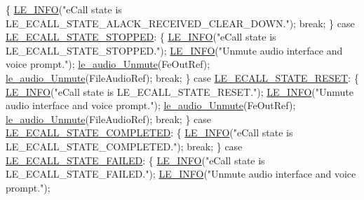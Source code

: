 \begin{DoxyCodeInclude}
{{{{{{{{        \{
            \hyperlink{le__log_8h_a23e6d206faa64f612045d688cdde5808}{LE\_INFO}(\textcolor{stringliteral}{"eCall state is LE\_ECALL\_STATE\_ALACK\_RECEIVED\_CLEAR\_DOWN."});
            \textcolor{keywordflow}{break};
        \}
        \textcolor{keywordflow}{case} \hyperlink{le__ecall__interface_8h_a233609e4724e549a1405f9177c0a07dda28740cfb795561c243501bff53343175}{LE\_ECALL\_STATE\_STOPPED}:
        \{
            \hyperlink{le__log_8h_a23e6d206faa64f612045d688cdde5808}{LE\_INFO}(\textcolor{stringliteral}{"eCall state is LE\_ECALL\_STATE\_STOPPED."});
            \hyperlink{le__log_8h_a23e6d206faa64f612045d688cdde5808}{LE\_INFO}(\textcolor{stringliteral}{"Unmute audio interface and voice prompt."});
            \hyperlink{le__audio__interface_8h_adad24547293481964039efe56bc14e2b}{le\_audio\_Unmute}(FeOutRef);
            \hyperlink{le__audio__interface_8h_adad24547293481964039efe56bc14e2b}{le\_audio\_Unmute}(FileAudioRef);
            \textcolor{keywordflow}{break};
        \}
        \textcolor{keywordflow}{case} \hyperlink{le__ecall__interface_8h_a233609e4724e549a1405f9177c0a07dda71a12603e5a05716c7579e12f6f85734}{LE\_ECALL\_STATE\_RESET}:
        \{
            \hyperlink{le__log_8h_a23e6d206faa64f612045d688cdde5808}{LE\_INFO}(\textcolor{stringliteral}{"eCall state is LE\_ECALL\_STATE\_RESET."});
            \hyperlink{le__log_8h_a23e6d206faa64f612045d688cdde5808}{LE\_INFO}(\textcolor{stringliteral}{"Unmute audio interface and voice prompt."});
            \hyperlink{le__audio__interface_8h_adad24547293481964039efe56bc14e2b}{le\_audio\_Unmute}(FeOutRef);
            \hyperlink{le__audio__interface_8h_adad24547293481964039efe56bc14e2b}{le\_audio\_Unmute}(FileAudioRef);
            \textcolor{keywordflow}{break};
        \}
        \textcolor{keywordflow}{case} \hyperlink{le__ecall__interface_8h_a233609e4724e549a1405f9177c0a07dda40cb68755482f2068f414e4bd1d2bf13}{LE\_ECALL\_STATE\_COMPLETED}:
        \{
            \hyperlink{le__log_8h_a23e6d206faa64f612045d688cdde5808}{LE\_INFO}(\textcolor{stringliteral}{"eCall state is LE\_ECALL\_STATE\_COMPLETED."});
            \textcolor{keywordflow}{break};
        \}
        \textcolor{keywordflow}{case} \hyperlink{le__ecall__interface_8h_a233609e4724e549a1405f9177c0a07dda5275385371c51e441a9eb97626c271b4}{LE\_ECALL\_STATE\_FAILED}:
        \{
            \hyperlink{le__log_8h_a23e6d206faa64f612045d688cdde5808}{LE\_INFO}(\textcolor{stringliteral}{"eCall state is LE\_ECALL\_STATE\_FAILED."});
            \hyperlink{le__log_8h_a23e6d206faa64f612045d688cdde5808}{LE\_INFO}(\textcolor{stringliteral}{"Unmute audio interface and voice prompt."});
}}}}}}}}
\end{DoxyCodeInclude}
